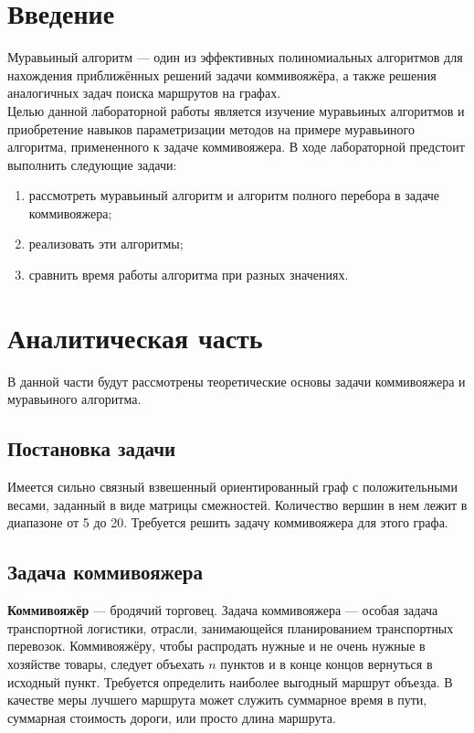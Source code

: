 \documentclass[a4paper, 12pt]{article}
\begin{document}
\tableofcontents
\clearpage
\newpage

\section*{Введение}


	\hspace*{5mm} Муравьиный алгоритм — один из эффективных полиномиальных алгоритмов для нахождения приближённых решений задачи коммивояжёра, а также решения аналогичных задач поиска маршрутов на графах.
	\\ \hspace*{5mm}Целью данной лабораторной работы является изучение муравьиных алгоритмов и приобретение навыков параметризации методов на примере муравьиного алгоритма, примененного к задаче коммивояжера. 
	\newline В ходе лабораторной предстоит выполнить следующие задачи: 
	\begin{enumerate}
		\item рассмотреть муравьиный алгоритм и алгоритм полного перебора в задаче коммивояжера;
		\item реализовать эти алгоритмы;
		\item сравнить время работы алгоритма при разных значениях.
	\end{enumerate}
	

\clearpage
\newpage
\section{Аналитическая часть}

	\hspace*{5mm} В данной части будут рассмотрены теоретические основы задачи коммивояжера и муравьиного алгоритма.
	\subsection{Постановка задачи}
	\hspace*{5mm} Имеется сильно связный взвешенный ориентированный граф с положительными весами, заданный в виде матрицы смежностей. Количество вершин в нем лежит в диапазоне от 5 до 20. Требуется решить задачу коммивояжера для этого графа. 

	\subsection{Задача коммивояжера}
	\hspace*{5mm} \textbf{Коммивояжёр} — бродячий торговец. Задача коммивояжера — особая задача транспортной логистики, отрасли, занимающейся планированием транспортных перевозок. Коммивояжёру, чтобы распродать нужные и не очень нужные в хозяйстве товары, следует объехать $n$ пунктов и в конце концов вернуться в исходный пункт. Требуется определить наиболее выгодный маршрут объезда. В качестве меры лучшего маршрута может служить суммарное время в пути, суммарная стоимость дороги, или просто длина маршрута.
\end{document}
